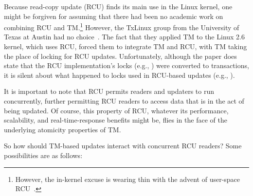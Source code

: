 Because read-copy update (RCU) finds its main use in the Linux kernel,
one might be forgiven for assuming that there had been no academic work
on combining RCU and TM.\footnote{
	However, the in-kernel excuse is wearing thin with the advent
	of user-space RCU~\cite{MathieuDesnoyers2009URCU,MathieuDesnoyers2012URCU}.}
However, the TxLinux group from the University of Texas at Austin had
no choice~\cite{ChistopherJRossbach2007a}.
The fact that they applied TM to the Linux 2.6 kernel, which uses RCU,
forced them to integrate TM and RCU, with TM taking the place of locking
for RCU updates.
Unfortunately, although the paper does state that the RCU implementation's
locks (e.g., ) were converted to transactions,
it is silent about what happened to locks used in RCU-based updates
(e.g., ).

It is important to note that RCU permits readers and updaters to run
concurrently, further permitting RCU readers to access data that is in
the act of being updated.
Of course, this property of RCU, whatever its performance, scalability,
and real-time-response benefits might be, flies in the face of the
underlying atomicity properties of TM.

So how should TM-based updates interact with concurrent RCU readers?
Some possibilities are as follows:

